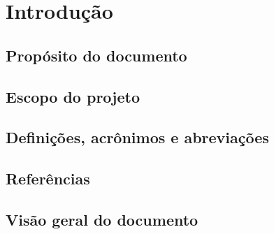 \chapter{Introdução}
\section{Propósito do documento}
\section{Escopo do projeto}
\section{Definições, acrônimos e abreviações}
\section{Referências}
\section{Visão geral do documento}

